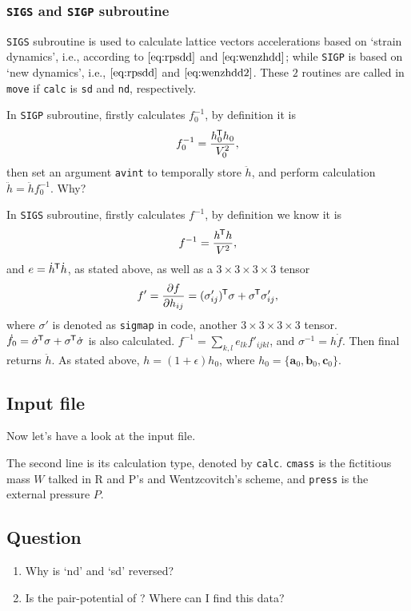 \subsubsection{\texttt{SIGS} and \texttt{SIGP} subroutine}

\texttt{SIGS} subroutine is used to calculate lattice vectors accelerations
based on `strain dynamics', i.e., according to $\eqref{eq:rpsdd}$ and
$\eqref{eq:wenzhdd}$; while \texttt{SIGP} is based on `new dynamics',
i.e., $\eqref{eq:rpsdd}$ and $\eqref{eq:wenzhdd2}$. These $2$ routines
are called in \texttt{move} if \texttt{calc} is \texttt{sd} and \texttt{nd}, respectively.

In \texttt{SIGP} subroutine,
firstly calculates $f_0^{-1}$, by definition it is
\begin{equation}
	f_0^{-1} = \frac{ h_0 ^{\mkern-1.5mu\mathsf{T}} h_0}{ V_0^2 },
\end{equation}
then set an argument \texttt{avint} to temporally store $\ddot{h}$,
and perform calculation $\ddot{h} = \ddot{h} f_0^{-1}$. Why?


In \texttt{SIGS} subroutine,
firstly calculates $f^{-1}$, by definition we know it is
\begin{equation}
	f^{-1} = \frac{ h ^{\mkern-1.5mu\mathsf{T}} h }{ V^2 },
\end{equation}
and $e = \dot{ h }^{\mkern-1.5mu\mathsf{T}} \dot{ h }$, as stated above, as well as
a $3\times 3 \times 3 \times 3$ tensor
\begin{equation}
	f ' = \frac{ \partial f }{ \partial h_{ij} } = (\sigma'_{ij})^{\mkern-1.5mu\mathsf{T}} \sigma
	+ \sigma ^{\mkern-1.5mu\mathsf{T}} \sigma'_{ij},
\end{equation}
where $\sigma'$ is denoted as \texttt{sigmap} in code, another $3\times 3
\times 3 \times 3$ tensor.
$\dot{f}_0 = \dot{ \sigma } ^{\mkern-1.5mu\mathsf{T}} \sigma + \sigma ^{\mkern-1.5mu\mathsf{T}} \dot{ \sigma }$ is
also calculated.
$f^{-1} = \sum_{k, l} e_{lk} f'_{ijkl}$, and $\sigma^{-1} = h \dot{ f }$.
Then final returns $\ddot{h}$. As stated above, $h = (1 + \epsilon) h_0$,
where $h_0 = \{ \bm{a}_0, \bm{b}_0, \bm{c}_0 \}$.


\subsection{Input file}

Now let's have a look at the input file.

The second line is its calculation type, denoted by
\texttt{calc}. \texttt{cmass} is the fictitious mass $W$ talked
in R and P's and Wentzcovitch's scheme, and \texttt{press} is the
external pressure $P$.


\subsection{Question}

\begin{enumerate}
	\item Why is `nd' and `sd' reversed?
	\item Is the pair-potential of ? Where can I find this
	      data?
\end{enumerate}
